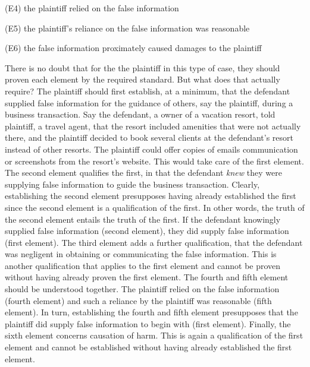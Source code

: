 \documentclass[
  10pt,
  dvipsnames,enabledeprecatedfontcommands]{scrartcl}
\begin{document}
(E4) the plaintiff relied on the false information

(E5) the plaintiff's reliance on the false information was reasonable

(E6) the false information proximately caused damages to the plaintiff

There is no doubt that for the the plaintiff in this type of case, they
should proven each element by the required standard. But what does that
actually require? The plaintiff should first establish, at a minimum,
that the defendant supplied false information for the guidance of
others, say the plaintiff, during a business transaction. Say the
defendant, a owner of a vacation resort, told plaintiff, a travel agent,
that the resort included amenities that were not actually there, and the
plaintiff decided to book several clients at the defendant's resort
instead of other resorts. The plaintiff could offer copies of emails
communication or screenshots from the resort's website. This would take
care of the first element. The second element qualifies the first, in
that the defendant \emph{knew} they were supplying false information to
guide the business transaction. Clearly, establishing the second element
presupposes having already established the first since the second
element is a qualification of the first. In other words, the truth of
the second element entails the truth of the first. If the defendant
knowingly supplied false information (second element), they did supply
false information (first element). The third element adds a further
qualification, that the defendant was negligent in obtaining or
communicating the false information. This is another qualification that
applies to the first element and cannot be proven without having already
proven the first element. The fourth and fifth element should be
understood together. The plaintiff relied on the false information
(fourth element) and such a reliance by the plaintiff was reasonable
(fifth element). In turn, establishing the fourth and fifth element
presupposes that the plaintiff did supply false information to begin
with (first element). Finally, the sixth element concerns causation of
harm. This is again a qualification of the first element and cannot be
established without having already established the first element.
\end{document}
